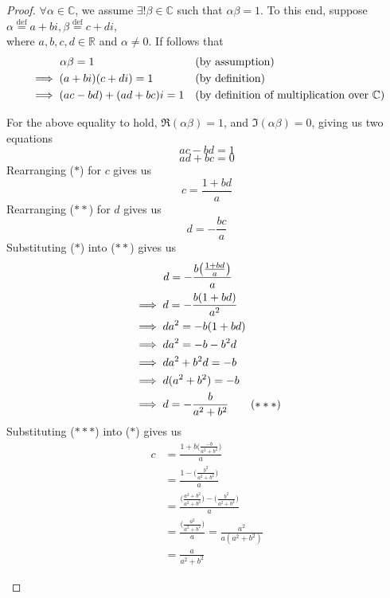 \documentclass{article}
\begin{document}
\begin{proof}
    $\forall \alpha \in \mathbb{C}$, we assume $\exists! \beta \in \mathbb{C}$ such that $\alpha\beta = 1$. To this end, suppose $\alpha \stackrel{\text{def}}{=} a + bi, \beta \stackrel{\text{def}}{=} c + di$, \\
    \indent where $a, b, c, d \in \mathbb{R}$ and $\alpha \neq 0$. If follows that
    \begin{align*}
        &\hspace{9.75 mm} \alpha\beta = 1 &&\text{(by assumption)}\\
        &\implies (a + bi)(c + di) =1 &&\text{(by definition)}\\
        &\implies (ac - bd) + (ad + bc)i = 1 &&\text{(by definition of multiplication over $\mathbb{C}$)}\\
    \end{align*}

    \begin{mdframed}[
    linecolor=red,        
    fontcolor=red         
]
        \indent For the above equality to hold, $\Re(\alpha\beta) = 1$, and $\Im(\alpha\beta) = 0$, giving us two equations\\
        \[ac - bd = 1 \tag{$\ast$}\]
        \[ad + bc = 0 \tag{$\ast\ast$}\]
        \indent Rearranging ($\ast$) for $c$ gives us
        \[c = \frac{1 + bd}{a}\]
        \indent Rearranging ($\ast\ast$) for $d$ gives us
        \[d = -\frac{bc}{a}\]
        \indent Substituting ($\ast$) into ($\ast\ast$) gives us
        \begin{align*}
            &\hspace{9.75 mm} d = -\frac{b\big(\frac{1 + bd}{a}\big)}{a} \\
            &\implies d = -\frac{b(1 + bd)}{a^{2}} \\
            &\implies da^{2} = - b(1 + bd) \\
            &\implies da^{2} = - b - b^{2}d \\
            &\implies da^{2} + b^{2}d = - b \\
            &\implies d(a^{2} + b^{2}) = - b \\
            &\implies d = -\frac{b}{a^{2} + b^{2}} \tag{$\ast\ast\ast$}
        \end{align*}
        \indent Substituting ($\ast\ast\ast$) into ($\ast$) gives us
        \begin{align*}
            c &= \frac{1 + b\big(\frac{-b}{a^{2} + b^{2}}\big)}{a} \\
            &= \frac{1 - \big(\frac{b^{2}}{a^{2} + b^{2}}\big)}{a} \\
            &= \frac{\big(\frac{a^{2} + b^{2}}{a^{2} + b^{2}}\big) - \big(\frac{b^{2}}{a^{2} + b^{2}}\big)}{a} \\
            &= \frac{\big(\frac{a^{2}}{a^{2} + b^{2}}\big)}{a} = \frac{a^{2}}{a(a^{2} + b^{2})} \\
            &= \frac{a}{a^{2} + b^{2}}
        \end{align*}
    \end{mdframed}
    

\end{proof}
\end{document}
